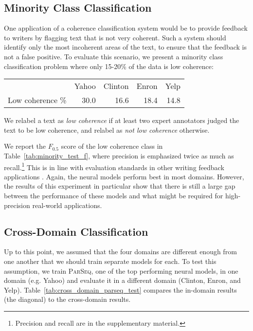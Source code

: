 \documentclass[11pt,a4paper]{article}
\newcommand \parseq{\textsc{ParSeq}\xspace}
\begin{document}
\subsection{Minority Class Classification}

One application of a coherence classification system would be to provide feedback to writers by flagging text that is not very coherent. 
Such a system should identify only the most incoherent areas of the text, to ensure that the feedback is not a false positive. To evaluate this scenario, we present a minority class classification problem where only 15-20\% of the data is low coherence:

\begin{center}
\begin{small}
\begin{tabular}{lrrrr}
	\toprule
	 & Yahoo & Clinton & Enron & Yelp \\	
    Low coherence \% & 30.0 & 16.6 & 18.4 & 14.8 \\
	\bottomrule
\end{tabular}
\label{tab:minority_class_percent}
\end{small}
\end{center}

We relabel a text as \textit{low coherence} if at least two expert annotators judged the text to be low coherence, and relabel as \textit{not low coherence} otherwise.



We report the $F_{0.5}$ score of the low coherence class in Table~\ref{tab:minority_test_f}, where precision is emphasized twice as much as recall.\footnote{Precision and recall are in the supplementary material.}   This is in line with evaluation standards in other writing feedback applications \cite{ng-EtAl:2014:W14-17}.
Again, the neural models perform best in most domains. However, the results of this experiment in particular show that there is still a large gap between the performance of these models and what might be required for high-precision real-world applications.




\subsection{Cross-Domain Classification}

Up to this point, we assumed that the four domains are different enough from one another that we should train separate models for each. To test this assumption, we train \parseq, one of the top performing neural models, in one domain (e.g. Yahoo) and evaluate it in a different domain (Clinton, Enron, and Yelp).
Table~\ref{tab:cross_domain_parseq_test} compares the in-domain results (the diagonal) to the cross-domain results. 
\end{document}
